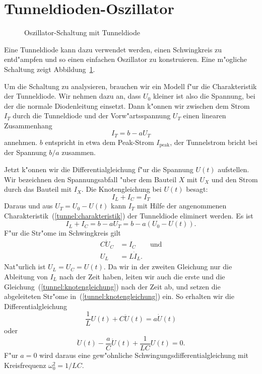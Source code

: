 %
%
%
\section{Tunneldioden-Oszillator}
\begin{figure}
\centering

\caption{Oszillator-Schaltung mit Tunneldiode
\label{tunnel:tunneldioden-oszillator}}
\end{figure}
Eine Tunneldiode kann dazu verwendet werden, einen Schwingkreis zu
entd"ampfen und so einen einfachen Oszillator zu konstruieren.
Eine m"ogliche Schaltung zeigt Abbildung~\ref{tunnel:tunneldioden-oszillator}.

Um die Schaltung zu analysieren, brauchen wir ein Modell f"ur die
Charakteristik der Tunneldiode. Wir nehmen dazu an, dass $U_0$ kleiner
ist also die Spannung, bei der die normale Diodenleitung einsetzt.
Dann k"onnen wir zwischen dem Strom $I_T$ durch die Tunneldiode
und der Vorw"artsspannung $U_T$ einen linearen Zusammenhang
\begin{equation}
I_T=b-aU_T
\label{tunnel:charakteristik}
\end{equation}
annehmen. $b$ entspricht in etwa dem Peak-Strom $I_{\text{peak}}$, der
Tunnelstrom bricht bei der Spannung $b/a$ zusammen.

Jetzt k"onnen wir die Differentialgleichung f"ur die Spannung $U(t)$
aufstellen. Wir bezeichnen den Spannungsabfall "uber dem Bauteil $X$
mit $U_X$ und den Strom durch das Bauteil mit $I_X$. Die Knotengleichung
bei $U(t)$ besagt:
\[
I_L+I_C=I_T
\]
Daraus und aus $U_T=U_0-U(t)$ kann $I_T$ mit Hilfe der angenommenen
Charakteristik~(\ref{tunnel:charakteristik}) der Tunneldiode eliminert werden.
Es ist
\begin{equation}
I_L+I_C=b-aU_T=b-a(U_0-U(t)).
\label{tunnel:knotengleichung}
\end{equation}
F"ur die Str"ome im Schwingkreis gilt
\begin{align*}
C\dot U_C&=I_C \qquad\text{und}\\
U_L&=L\dot I_L.
\end{align*}
Nat"urlich ist $U_L=U_C=U(t)$.
Da wir in der zweiten Gleichung nur die Ableitung von $I_L$ nach
der Zeit haben, leiten wir
auch die erste und die Gleichung~(\ref{tunnel:knotengleichung}) nach
der Zeit ab, und setzen die abgeleiteten Str"ome
in~(\ref{tunnel:knotengleichung}) ein.
So erhalten wir die Differentialgleichung
\begin{equation*}
\frac1{L}U(t) +C\ddot U(t)=a\dot U(t)
\end{equation*}
oder
\begin{equation}
\ddot U(t)
-\frac{a}{C}\dot U(t)
+\frac1{LC}U(t)
=0.
\label{tunnel:dgl1}
\end{equation}
F"ur $a=0$ wird daraus eine gew"ohnliche Schwingungsdifferentialgleichung
mit Kreisfrequenz $\omega_0^2=1/LC$.

